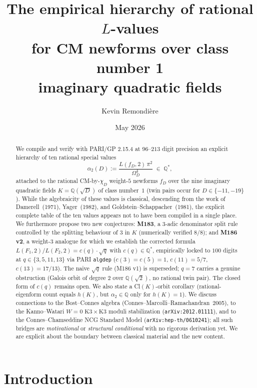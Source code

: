 \documentclass[12pt]{amsart}
\title{The empirical hierarchy of rational $L$-values\\
       for CM newforms over class number 1\\
       imaginary quadratic fields}
\author{Kevin Remondière}
\date{May 2026}
\theoremstyle{definition}
\newcommand{\Q}{\mathbb{Q}}
\begin{document}
\begin{abstract}
We compile and verify with PARI/GP 2.15.4 at $96$--$213$ digit precision an
explicit hierarchy of ten rational special values
\[
  \alpha_2(D) := \frac{L(f_D,2)\,\pi^2}{\Omega_D^4} \;\in\; \Q^*,
\]
attached to the rational CM-by-$\chi_D$ weight-$5$ newforms $f_D$ over the
nine imaginary quadratic fields $K = \Q(\sqrt{D})$ of class number~$1$
(twin pairs occur for $D \in \{-11,-19\}$).
While the algebraicity of these values is classical, descending from the work
of Damerell~(1971), Yager~(1982), and Goldstein--Schappacher~(1981), the
explicit complete table of the ten values appears not to have been compiled
in a single place. We furthermore propose two new conjectures:
\textbf{M183}, a $3$-adic denominator split rule controlled by the splitting
behaviour of $3$ in $K$ (numerically verified $8/8$); and \textbf{M186 v2}, a
weight-$3$ analogue for which we establish the corrected formula
$L(F_1,2)/L(F_2,2) = c(q)\cdot\sqrt{q}$ with $c(q)\in\Q^*$, empirically
locked to $100$ digits at $q\in\{3,5,11,13\}$ via PARI \texttt{algdep}
($c(3)=c(5)=1$, $c(11)=5/7$, $c(13)=17/13$). The naive $\sqrt{q}$ rule
(M186 v1) is superseded; $q=7$ carries a genuine obstruction (Galois orbit
of degree $2$ over $\Q(\sqrt{2})$, no rational twin pair). The closed form
of $c(q)$ remains open. We also state a Cl$(K)$-orbit corollary
(rational-eigenform count equals $h(K)$, but $\alpha_2 \in \Q$ only for
$h(K)=1$).
We discuss connections to the Bost--Connes algebra
(Connes--Marcolli--Ramachandran~2005), to the Kanno--Watari $W=0$
$\mathrm{K3}\times\mathrm{K3}$ moduli stabilization
(\texttt{arXiv:2012.01111}), and to the Connes--Chamseddine NCG Standard
Model (\texttt{arXiv:hep-th/0610241}); all such bridges are
\emph{motivational} or \emph{structural conditional} with no rigorous
derivation yet. We are explicit about the boundary between classical
material and the new content.
\end{abstract}

\maketitle
\tableofcontents

\section{Introduction}
\label{sec:intro}
\end{document}

